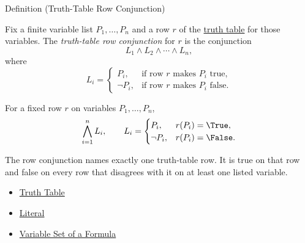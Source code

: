 \begin{definitionbox}{Definition (Truth-Table Row Conjunction)}
\begin{definition}
\label{def:truth-table-row-conjunction-propositional-logic}
Fix a finite variable list \(P_1,\ldots,P_n\) and a row \(r\) of the
\hyperref[def:truth-table-propositional-logic]{truth table} for those
variables. The \emph{truth-table row conjunction} for \(r\) is the conjunction
\[
L_1\land L_2\land\cdots\land L_n,
\]
where
\[
L_i=
\begin{cases}
P_i, & \text{if row }r\text{ makes }P_i\text{ true},\\
\neg P_i, & \text{if row }r\text{ makes }P_i\text{ false}.
\end{cases}
\]
\end{definition}
\end{definitionbox}

\begin{remark*}
For a fixed row \(r\) on variables \(P_1,\ldots,P_n\),
\[
\bigwedge_{i=1}^{n} L_i,
\qquad
L_i=
\begin{cases}
P_i, & r(P_i)=\True,\\
\neg P_i, & r(P_i)=\False.
\end{cases}
\]
\end{remark*}

\begin{remark*}[Interpretation]
The row conjunction names exactly one truth-table row. It is true on that row
and false on every row that disagrees with it on at least one listed variable.
\end{remark*}

\begin{dependencies}
\begin{itemize}
  \item \hyperref[def:truth-table-propositional-logic]{Truth Table}
  \item \hyperref[def:literal-propositional-logic]{Literal}
  \item \hyperref[def:formula-variable-set-propositional-logic]{Variable Set of a Formula}
\end{itemize}
\end{dependencies}

